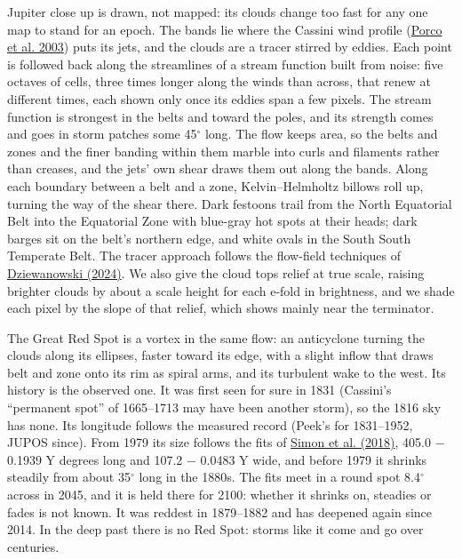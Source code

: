 \documentclass[9pt,twocolumn]{extarticle}
\begin{document}
Jupiter close up is drawn, not mapped: its clouds change too fast for any one map to stand for an epoch. The bands lie where the Cassini wind profile (\protect\hyperlink{cite.porco2003}{Porco et al. 2003}) puts its jets, and the clouds are a tracer stirred by eddies. Each point is followed back along the streamlines of a stream function built from noise: five octaves of cells, three times longer along the winds than across, that renew at different times, each shown only once its eddies span a few pixels. The stream function is strongest in the belts and toward the poles, and its strength comes and goes in storm patches some 45$^\circ$ long. The flow keeps area, so the belts and zones and the finer banding within them marble into curls and filaments rather than creases, and the jets' own shear draws them out along the bands. Along each boundary between a belt and a zone, Kelvin--Helmholtz billows roll up, turning the way of the shear there. Dark festoons trail from the North Equatorial Belt into the Equatorial Zone with blue-gray hot spots at their heads; dark barges sit on the belt's northern edge, and white ovals in the South South Temperate Belt. The tracer approach follows the flow-field techniques of \protect\hyperlink{cite.dziewanowski_flowfields}{Dziewanowski (2024)}. We also give the cloud tops relief at true scale, raising brighter clouds by about a scale height for each e-fold in brightness, and we shade each pixel by the slope of that relief, which shows mainly near the terminator.

The Great Red Spot is a vortex in the same flow: an anticyclone turning the clouds along its ellipses, faster toward its edge, with a slight inflow that draws belt and zone onto its rim as spiral arms, and its turbulent wake to the west. Its history is the observed one. It was first seen for sure in 1831 (Cassini's ``permanent spot'' of 1665--1713 may have been another storm), so the 1816 sky has none. Its longitude follows the measured record (Peek's for 1831--1952, JUPOS since). From 1979 its size follows the fits of \protect\hyperlink{cite.simon2018}{Simon et al. (2018)}, 405.0 $-$ 0.1939 Y degrees long and 107.2 $-$ 0.0483 Y wide, and before 1979 it shrinks steadily from about 35$^\circ$ long in the 1880s. The fits meet in a round spot 8.4$^\circ$ across in 2045, and it is held there for 2100: whether it shrinks on, steadies or fades is not known. It was reddest in 1879--1882 and has deepened again since 2014. In the deep past there is no Red Spot: storms like it come and go over centuries.
\end{document}
